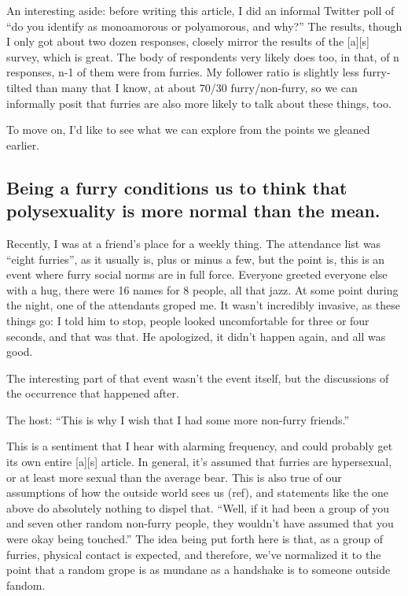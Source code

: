 An interesting aside: before writing this article, I did an informal Twitter poll of ``do you identify as monoamorous or polyamorous, and why?'' The results, though I only got about two dozen responses, closely mirror the results of the [a][s] survey, which is great. The body of respondents very likely does too, in that, of n responses, n-1 of them were from furries. My follower ratio is slightly less furry-tilted than many that I know, at about 70/30 furry/non-furry, so we can informally posit that furries are also more likely to talk about these things, too.

To move on, I'd like to see what we can explore from the points we gleaned earlier.

\subsection*{Being a furry conditions us to think that polysexuality is more normal than the mean.}

Recently, I was at a friend's place for a weekly thing. The attendance list was ``eight furries'', as it usually is, plus or minus a few, but the point is, this is an event where furry social norms are in full force. Everyone greeted everyone else with a hug, there were 16 names for 8 people, all that jazz. At some point during the night, one of the attendants groped me. It wasn't incredibly invasive, as these things go: I told him to stop, people looked uncomfortable for three or four seconds, and that was that. He apologized, it didn't happen again, and all was good.

The interesting part of that event wasn't the event itself, but the discussions of the occurrence that happened after.

The host: ``This is why I wish that I had some more non-furry friends.''

This is a sentiment that I hear with alarming frequency, and could probably get its own entire [a][s] article. In general, it's assumed that furries are hypersexual, or at least more sexual than the average bear. This is also true of our assumptions of how the outside world sees us (ref), and statements like the one above do absolutely nothing to dispel that. ``Well, if it had been a group of you and seven other random non-furry people, they wouldn't have assumed that you were okay being touched.'' The idea being put forth here is that, as a group of furries, physical contact is expected, and therefore, we've normalized it to the point that a random grope is as mundane as a handshake is to someone outside fandom.

